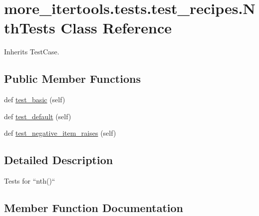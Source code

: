 \hypertarget{classmore__itertools_1_1tests_1_1test__recipes_1_1_nth_tests}{}\section{more\+\_\+itertools.\+tests.\+test\+\_\+recipes.\+Nth\+Tests Class Reference}
\label{classmore__itertools_1_1tests_1_1test__recipes_1_1_nth_tests}


Inherits Test\+Case.

\subsection*{Public Member Functions}
\begin{DoxyCompactItemize}
\item 
def \hyperlink{classmore__itertools_1_1tests_1_1test__recipes_1_1_nth_tests_a82bb832f914314427494e997f8a3c7d3}{test\+\_\+basic} (self)
\item 
def \hyperlink{classmore__itertools_1_1tests_1_1test__recipes_1_1_nth_tests_a979086b5ee43444a16dd47844262b29d}{test\+\_\+default} (self)
\item 
def \hyperlink{classmore__itertools_1_1tests_1_1test__recipes_1_1_nth_tests_ae3342682268718353da2abe82472acf6}{test\+\_\+negative\+\_\+item\+\_\+raises} (self)
\end{DoxyCompactItemize}


\subsection{Detailed Description}
\begin{DoxyVerb}Tests for ``nth()``\end{DoxyVerb}
 

\subsection{Member Function Documentation}
\mbox{\label{classmore__itertools_1_1tests_1_1test__recipes_1_1_nth_tests_a82bb832f914314427494e997f8a3c7d3}} 
